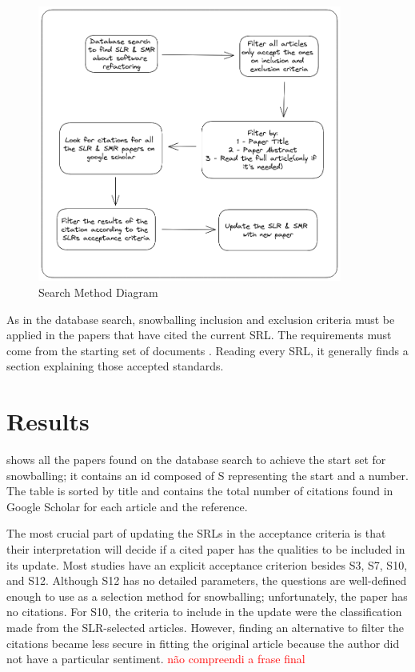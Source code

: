 \begin{figure}[ht!]
\SetCaptionWidth{\textwidth}
\caption{Search Method Diagram}
\label{fig-snow}
\includegraphics[width =100mm]{Chapter-3/Figures/snowballing_diagram.png}
\end{figure}
\FloatBarrier

As in the database search, snowballing inclusion and exclusion criteria must be applied in the papers that have cited the current SRL. The requirements must come from the starting set of documents \cite{Wohlin2020}. Reading every SRL, it generally finds a section explaining those accepted standards.


\section{Results}
\label{sec-results}
 shows all the papers found on the database search to achieve the start set for snowballing; it contains an id composed of S representing the start and a number. The table is sorted by title and contains the total number of citations found in Google Scholar for each article and the reference.



The most crucial part of updating the SRLs in the acceptance criteria is that their interpretation will decide if a cited paper has the qualities to be included in its update. Most studies have an explicit acceptance criterion besides S3, S7, S10, and S12. Although S12 has no detailed parameters, the questions are well-defined enough to use as a selection method for snowballing; unfortunately, the paper has no citations. For S10, the criteria to include in the update were the classification made from the SLR-selected articles. However, finding an alternative to filter the citations became less secure in fitting the original article because the author did not have a particular sentiment. \textcolor{red}{não compreendi a frase final}

